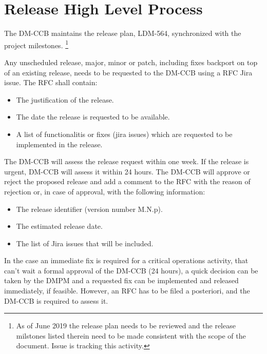 \section{Release High Level Process} \label{sec:process}

The DM-CCB maintains the release plan, LDM-564, synchronized with the project milestones.
\footnote{As of June 2019 the release plan needs to be reviewed and the release milstones listed therein need to be made consistent with the scope of the document.
Issue  is tracking this activity.}

Any unscheduled release, major, minor or patch, including fixes backport on top of an existing release, needs to be requested to the DM-CCB using a RFC Jira issue.
The RFC shall contain:

\begin{itemize}
\item The justification of the release.
\item The date the release is requested to be available.
\item A list of functionalitis or fixes (jira issues) which are requested to be implemented in the release.
\end{itemize}

The DM-CCB  will assess the release request within one week. 
If the release is urgent, DM-CCB will assess it  within 24 hours.
The DM-CCB will approve or reject the proposed release and add a comment to the RFC with the reason of rejection or, in case of approval, with the following information:

\begin{itemize}
\item The release identifier (version number M.N.p).
\item The estimated release date.
\item The list of Jira issues that will be included.
\end{itemize}

In the case an immediate fix is required for a critical operations activity, that can't wait a formal approval of the DM-CCB (24 hours),
a quick decision can be taken by the \gls{DMPM} and a requested fix can be implemented and released immediately, if feasible.
However, an \gls{RFC} has to be filed a posteriori, and the DM-CCB is required to assess it.

